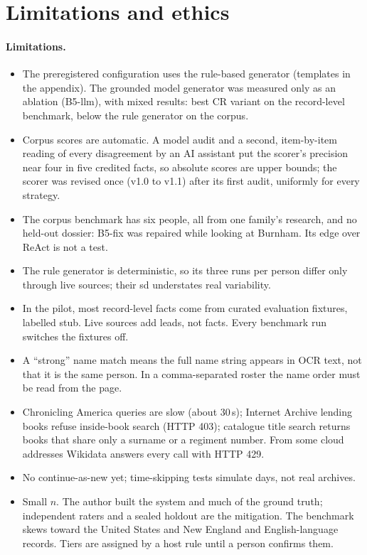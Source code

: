 \section{Limitations and ethics}
\label{sec:limits}

\paragraph{Limitations.}
\begin{itemize}
\item The preregistered configuration uses the rule-based generator (templates in the appendix). The grounded model generator was measured only as an ablation (B5-llm), with mixed results: best CR variant on the record-level benchmark, below the rule generator on the corpus.
\item Corpus scores are automatic. A model audit and a second, item-by-item reading of every disagreement by an AI assistant put the scorer's precision near four in five credited facts, so absolute scores are upper bounds; the scorer was revised once (v1.0 to v1.1) after its first audit, uniformly for every strategy.
\item The corpus benchmark has six people, all from one family's research, and no held-out dossier: B5-fix was repaired while looking at Burnham. Its edge over ReAct is not a test.
\item The rule generator is deterministic, so its three runs per person differ only through live sources; their sd understates real variability.
\item In the pilot, most record-level facts come from curated evaluation fixtures, labelled stub. Live sources add leads, not facts. Every benchmark run switches the fixtures off.
\item A ``strong'' name match means the full name string appears in OCR text, not that it is the same person. In a comma-separated roster the name order must be read from the page.
\item Chronicling America queries are slow (about 30\,s); Internet Archive lending books refuse inside-book search (HTTP 403); catalogue title search returns books that share only a surname or a regiment number. From some cloud addresses Wikidata answers every call with HTTP 429.
\item No continue-as-new yet; time-skipping tests simulate days, not real archives.
\item Small $n$. The author built the system and much of the ground truth; independent raters and a sealed holdout are the mitigation. The benchmark skews toward the United States and New England and English-language records. Tiers are assigned by a host rule until a person confirms them.
\end{itemize}

